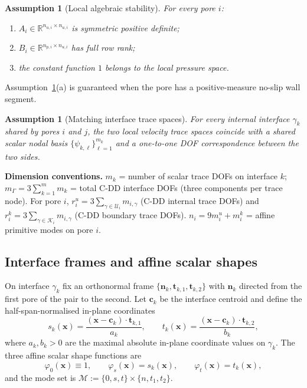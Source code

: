 \documentclass[11pt,a4paper]{article}
\newtheorem{assumption}[theorem]{Assumption}
\theoremstyle{definition}
\newcommand{\R}{\mathbb{R}}
\newcommand{\iface}{\gamma}
\newcommand{\normal}{\bm{n}}
\newcommand{\modeset}{\mathcal{M}}
\begin{document}
\begin{assumption}[Local algebraic stability]\label{ass:local}
  For every pore $i$:
  \begin{enumerate}[label=(\alph*),nosep,leftmargin=*]
    \item $A_i \in \R^{n_{u,i}\times n_{u,i}}$ is symmetric positive definite;
    \item $B_i \in \R^{n_{p,i}\times n_{u,i}}$ has full row rank;
    \item the constant function $1$ belongs to the local pressure space.
  \end{enumerate}
\end{assumption}

Assumption~\ref{ass:local}(a) is guaranteed when the pore has a
positive-measure no-slip wall segment.

\begin{assumption}[Matching interface trace spaces]\label{ass:matching}
  For every internal interface $\iface_k$ shared by pores $i$ and $j$,
  the two local velocity trace spaces coincide with a shared scalar
  nodal basis $\{\psi_{k,\ell}\}_{\ell=1}^{m_k}$ and a one-to-one DOF
  correspondence between the two sides.
\end{assumption}

\medskip\noindent
\textbf{Dimension conventions.}
$m_k$ = number of scalar trace DOFs on interface $k$;
$m_\Gamma = 3\sum_{k=1}^m m_k$ = total C-DD interface DOFs
(three components per trace node).
For pore $i$,
$r_i^u = 3\sum_{\gamma\in\mathcal{U}_i} m_{i,\gamma}$
(C-DD internal trace DOFs) and
$r_i^k = 3\sum_{\gamma\in\mathcal{K}_i} m_{i,\gamma}$
(C-DD boundary trace DOFs).
$n_i = 9m_i^u + m_i^k$ = affine primitive modes on pore $i$.

\subsection{Interface frames and affine scalar shapes}

On interface $\iface_k$ fix an orthonormal frame
$\{\normal_k,\bm{t}_{k,1},\bm{t}_{k,2}\}$ with $\normal_k$ directed
from the first pore of the pair to the second.  Let
$\bm{c}_k$ be the interface centroid and define the half-span-normalised
in-plane coordinates
\begin{equation}\label{eq:st}
  s_k(\bm{x}) = \frac{(\bm{x}-\bm{c}_k)\cdot\bm{t}_{k,1}}{a_k},\qquad
  t_k(\bm{x}) = \frac{(\bm{x}-\bm{c}_k)\cdot\bm{t}_{k,2}}{b_k},
\end{equation}
where $a_k,b_k > 0$ are the maximal absolute in-plane coordinate
values on $\iface_k$.  The three affine scalar shape functions are
\begin{equation}\label{eq:shapes}
  \varphi_0(\bm{x}) \equiv 1,\qquad
  \varphi_s(\bm{x}) = s_k(\bm{x}),\qquad
  \varphi_t(\bm{x}) = t_k(\bm{x}),
\end{equation}
and the mode set is
$\modeset := \{0,s,t\} \times \{n,t_1,t_2\}$.
\end{document}
